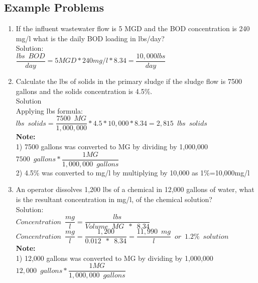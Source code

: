 \subsection{Example Problems}
\begin{enumerate}

\item If the influent wastewater flow is 5 MGD and the BOD concentration is 240 mg/l what is the daily BOD loading in lbs/day?\\
Solution:\\
$\dfrac{lbs \enspace BOD}{day}=5MGD*240mg/l*8.34=\boxed{\dfrac{10,000lbs}{day}}$\\

\item Calculate the lbs of solids in the primary sludge if the sludge flow is 7500 gallons and the solids concentration is 4.5\%.\\
Solution\\
Applying lbs formula:\\
$lbs \enspace solids = \dfrac{7500 \enspace MG}{1,000,000} * 4.5*10,000 *8.34 = \boxed{2,815 \enspace lbs \enspace solids}$\\
\textbf{Note:}\\  
1) 7500 gallons was converted to MG by dividing by 1,000,000\\
$7500 \enspace gallons * \dfrac{1 MG}{1,000,000 \enspace gallons}$\\
2) 4.5\% was converted to mg/l by multiplying by 10,000 as 1\%=10,000mg/l

\item An operator dissolves 1,200 lbs of a chemical in 12,000 gallons of water, what is the resultant concentration in mg/l, of the chemical solution?\\
Solution:\\
$Concentration \enspace \dfrac{mg}{l}=\dfrac{lbs}{Volume \enspace MG \enspace * \enspace 8.34}$\\
$Concentration \enspace \dfrac{mg}{l}=\dfrac{1,200}{0.012 \enspace * \enspace 8.34}=\boxed{\dfrac{11,990 \enspace mg}{l} \enspace or \enspace 1.2\% \enspace solution}$\\
\textbf{Note:}\\  
1) 12,000 gallons was converted to MG by dividing by 1,000,000\\
$12,000 \enspace gallons * \dfrac{1 MG}{1,000,000 \enspace gallons}$\\
\end{enumerate}
